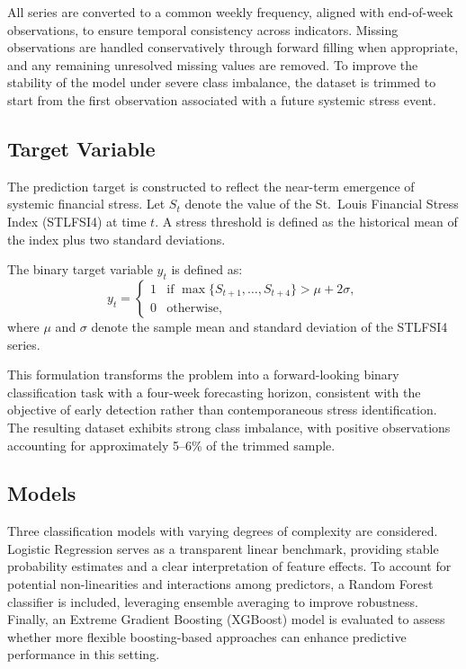 \documentclass[11pt,a4paper]{article}
\begin{document}
All series are converted to a common weekly frequency, aligned with end-of-week observations, to ensure temporal consistency across indicators. Missing observations are handled conservatively through forward filling when appropriate, and any remaining unresolved missing values are removed. To improve the stability of the model under severe class imbalance, the dataset is trimmed to start from the first observation associated with a future systemic stress event.

\subsection{Target Variable}
\label{subsec:target}

The prediction target is constructed to reflect the near-term emergence of systemic financial stress. Let $S_t$ denote the value of the St.\ Louis Financial Stress Index (STLFSI4) at time $t$. A stress threshold is defined as the historical mean of the index plus two standard deviations.

The binary target variable $y_t$ is defined as:
\[
y_t =
\begin{cases}
1 & \text{if } \max\{S_{t+1}, \dots, S_{t+4}\} > \mu + 2\sigma, \\
0 & \text{otherwise,}
\end{cases}
\]
where $\mu$ and $\sigma$ denote the sample mean and standard deviation of the STLFSI4 series.

This formulation transforms the problem into a forward-looking binary classification task with a four-week forecasting horizon, consistent with the objective of early detection rather than contemporaneous stress identification. The resulting dataset exhibits strong class imbalance, with positive observations accounting for approximately 5--6\% of the trimmed sample.

\subsection{Models}
\label{subsec:models}

Three classification models with varying degrees of complexity are considered. Logistic Regression serves as a transparent linear benchmark, providing stable probability estimates and a clear interpretation of feature effects. To account for potential non-linearities and interactions among predictors, a Random Forest classifier is included, leveraging ensemble averaging to improve robustness. Finally, an Extreme Gradient Boosting (XGBoost) model is evaluated to assess whether more flexible boosting-based approaches can enhance predictive performance in this setting.
\end{document}
